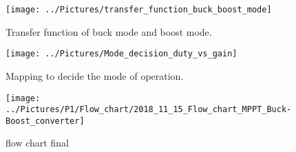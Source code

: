 \begin{figure}[H]
	\begin{minipage}[b]{0.8\linewidth}
		\centering
		\texttt{[image: ../Pictures/transfer\_function\_buck\_boost\_mode]}
		\caption{Transfer function of buck mode and boost mode.}
		\label{fig:tfmodes}
	\end{minipage}
	\hspace{0.5cm}
	\begin{minipage}[b]{0.8\linewidth}
		\centering
		\texttt{[image: ../Pictures/Mode\_decision\_duty\_vs\_gain]}
		\caption{Mapping to decide the mode of operation.}
		\label{fig:modedecisionmapping}
	\end{minipage}
\end{figure}


\begin{figure}[H]
	\begin{center}
		\texttt{[image: ../Pictures/P1/Flow\_chart/2018\_11\_15\_Flow\_chart\_MPPT\_Buck-Boost\_converter]}
		\caption{flow chart final }
		\label{fcfinal}
	\end{center}	
\end{figure}
